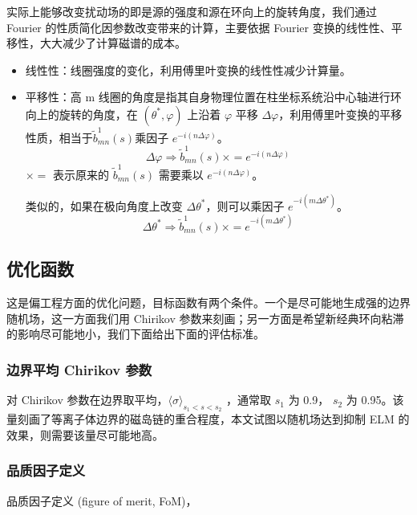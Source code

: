 实际上能够改变扰动场的即是源的强度和源在环向上的旋转角度，我们通过 Fourier 的性质简化因参数改变带来的计算，主要依据 Fourier 变换的线性性、平移性，大大减少了计算磁谱的成本。

  \begin{itemize}
    \item 线性性：线圈强度的变化，利用傅里叶变换的线性性减少计算量。
    \item 平移性：高 m 线圈的角度是指其自身物理位置在柱坐标系统沿中心轴进行环向上的旋转的角度，在 $(\theta^*, \varphi)$ 上沿着 $\varphi$ 平移 $\Delta\varphi$，利用傅里叶变换的平移性质，相当于$\tilde{b}_{m n}^{1}(s)$乘因子 $e^{-i\left(n \Delta\varphi \right )}$。
    \begin{equation}
      \Delta\varphi \Rightarrow \tilde{b}_{m n}^{1}(s)\times =e^{-i\left(n \Delta\varphi \right )}
    \end{equation}
    $\times =$ 表示原来的 $\tilde{b}_{m n}^{1}(s)$ 需要乘以 $e^{-i\left(n \Delta\varphi \right )}$。

     类似的，如果在极向角度上改变 $\Delta\theta^*$，则可以乘因子 $e^{-i\left(m \Delta\theta^* \right )}$。
     \begin{equation}
      \Delta\theta^* \Rightarrow \tilde{b}_{m n}^{1}(s)\times =e^{-i\left(m \Delta\theta^* \right )}
    \end{equation}
  \end{itemize}  
  


\subsection{优化函数}

    
    这是偏工程方面的优化问题，目标函数有两个条件。一个是尽可能地生成强的边界随机场，这一方面我们用 Chirikov 参数来刻画；另一方面是希望新经典环向粘滞的影响尽可能地小，我们下面给出下面的评估标准。

    \subsubsection{边界平均 Chirikov 参数}

    对 Chirikov 参数在边界取平均，$\langle\sigma\rangle_{s_{1}<s<s_{2}}$ ，通常取 $s_1$ 为 0.9， $s_2$ 为 0.95。该量刻画了等离子体边界的磁岛链的重合程度，本文试图以随机场达到抑制 ELM 的效果，则需要该量尽可能地高。
    

    \subsubsection{品质因子定义}
  品质因子定义 (figure of merit, FoM)，
  
